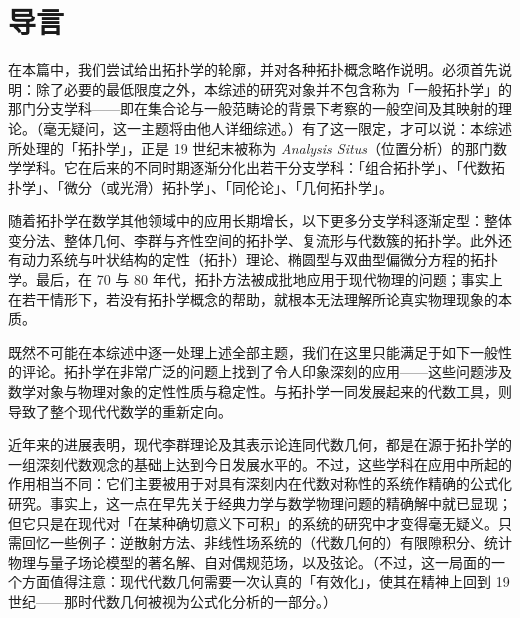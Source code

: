 \chapter*{导言}

在本篇中，我们尝试给出拓扑学的轮廓，并对各种拓扑概念略作说明。必须首先说明：除了必要的最低限度之外，本综述的研究对象并不包含称为「一般拓扑学」的那门分支学科——即在集合论与一般范畴论的背景下考察的一般空间及其映射的理论。（毫无疑问，这一主题将由他人详细综述。）有了这一限定，才可以说：本综述所处理的「拓扑学」，正是 19 世纪末被称为 \emph{Analysis Situs}（位置分析）的那门数学学科。它在后来的不同时期逐渐分化出若干分支学科：「组合拓扑学」、「代数拓扑学」、「微分（或光滑）拓扑学」、「同伦论」、「几何拓扑学」。


随着拓扑学在数学其他领域中的应用长期增长，以下更多分支学科逐渐定型：整体变分法、整体几何、李群与齐性空间的拓扑学、复流形与代数簇的拓扑学。此外还有动力系统与叶状结构的定性（拓扑）理论、椭圆型与双曲型偏微分方程的拓扑学。最后，在 70 与 80 年代，拓扑方法被成批地应用于现代物理的问题；事实上在若干情形下，若没有拓扑学概念的帮助，就根本无法理解所论真实物理现象的本质。

既然不可能在本综述中逐一处理上述全部主题，我们在这里只能满足于如下一般性的评论。拓扑学在非常广泛的问题上找到了令人印象深刻的应用——这些问题涉及数学对象与物理对象的定性性质与稳定性。与拓扑学一同发展起来的代数工具，则导致了整个现代代数学的重新定向。

近年来的进展表明，现代李群理论及其表示论连同代数几何，都是在源于拓扑学的一组深刻代数观念的基础上达到今日发展水平的。不过，这些学科在应用中所起的作用相当不同：它们主要被用于对具有深刻内在代数对称性的系统作精确的公式化研究。事实上，这一点在早先关于经典力学与数学物理问题的精确解中就已显现；但它只是在现代对「在某种确切意义下可积」的系统的研究中才变得毫无疑义。只需回忆一些例子：逆散射方法、非线性场系统的（代数几何的）有限隙积分、统计物理与量子场论模型的著名解、自对偶规范场，以及弦论。（不过，这一局面的一个方面值得注意：现代代数几何需要一次认真的「有效化」，使其在精神上回到 19 世纪——那时代数几何被视为公式化分析的一部分。）

